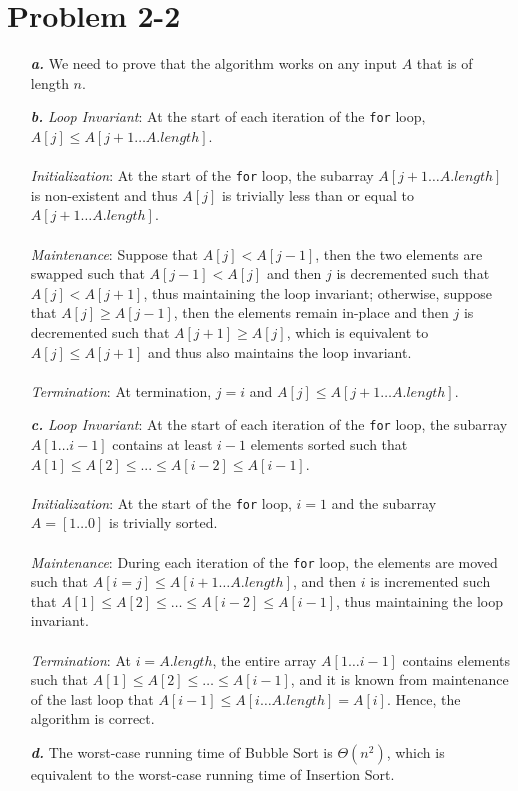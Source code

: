 \documentclass{article}
\begin{document}
\section*{Problem 2-2}

\noindent\begin{enumerate}
	\item[\textbf{\textit{a.}}] We need to prove that the algorithm works on any input $A$ that is of length $n$.

	\item[\textbf{\textit{b.}}] \textit{Loop Invariant}: At the start of each iteration of the \texttt{for} loop, $A[j] \leq A[j+1 \ldots A.length]$. \\ \\
				    \textit{Initialization}: At the start of the \texttt{for} loop, the subarray $A[j+1 \ldots A.length]$ is non-existent and thus $A[j]$ is trivially less than or equal to $A[j+1 \ldots A.length]$. \\ \\
				    \textit{Maintenance}: Suppose that $A[j] < A[j-1]$, then the two elements are swapped such that $A[j-1] < A[j]$ and then $j$ is decremented such that $A[j] < A[j+1]$, thus maintaining the loop invariant; otherwise, suppose that $A[j] \geq A[j-1]$, then the elements remain in-place and then $j$ is decremented such that $A[j+1] \geq A[j]$, which is equivalent to $A[j] \leq A[j+1]$ and thus also maintains the loop invariant. \\ \\
				    \textit{Termination}: At termination, $j=i$ and $A[j] \leq A[j+1 \ldots A.length]$.

	\item[\textbf{\textit{c.}}] \textit{Loop Invariant}: At the start of each iteration of the \texttt{for} loop, the subarray $A[1 \ldots i-1]$ contains at least $i-1$ elements sorted such that $A[1] \leq A[2] \leq ... \leq A[i-2] \leq A[i-1]$. \\ \\
				    \textit{Initialization}: At the start of the \texttt{for} loop, $i=1$ and the subarray $A=[1 \ldots 0]$ is trivially sorted. \\ \\
				    \textit{Maintenance}: During each iteration of the \texttt{for} loop, the elements are moved such that $A[i = j] \leq A[i+1 \ldots A.length]$, and then $i$ is incremented such that $A[1] \leq A[2] \leq \ldots \leq A[i-2] \leq A[i-1]$, thus maintaining the loop invariant. \\ \\
				    \textit{Termination}: At $i = A.length$, the entire array $A[1 \ldots i-1]$ contains elements such that $A[1] \leq A[2] \leq \ldots \leq A[i-1]$, and it is known from maintenance of the last loop that $A[i-1] \leq A[i \ldots A.length] = A[i]$. Hence, the algorithm is correct.

	\item[\textbf{\textit{d.}}] The worst-case running time of Bubble Sort is $\Theta(n^2)$, which is equivalent to the worst-case running time of Insertion Sort.
\end{enumerate}
\end{document}
